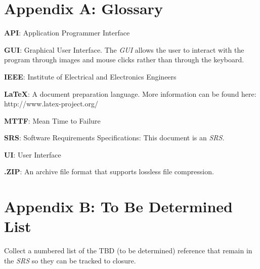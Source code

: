 \documentclass[a4paper, 12pt]{article}
\begin{document}
\section{Appendix A: Glossary} \label{sec:appendixa}
\begin{adjustwidth}{1em}{0pt}
\textbf{API}: Application Programmer Interface \newline

\noindent \textbf{GUI}: Graphical User Interface. The \textit{GUI} allows the user to interact with the program through images and mouse clicks rather than through the keyboard. \newline

\noindent \textbf{IEEE}: Institute of Electrical and Electronics Engineers \newline

\noindent \textbf{\LaTeX}: A document preparation language. More information can be found here: http://www.latex-project.org/ \newline

\noindent \textbf{MTTF}: Mean Time to Failure \newline

\noindent \textbf{SRS}: Software Requirements Specifications: This document is an \textit{SRS}. \newline

\noindent \textbf{UI}: User Interface \newline

\noindent \textbf{.ZIP}: An archive file format that supports lossless file compression. \newline
\end{adjustwidth}

\section{Appendix B: To Be Determined List} \label{sec:appendixb}
\begin{adjustwidth}{1em}{0pt}
\begin{enumerate}
\end{enumerate}
Collect a numbered list of the TBD (to be determined) reference that remain in the \textit{SRS} so they can be tracked to closure. 
\end{adjustwidth}
\end{document}
